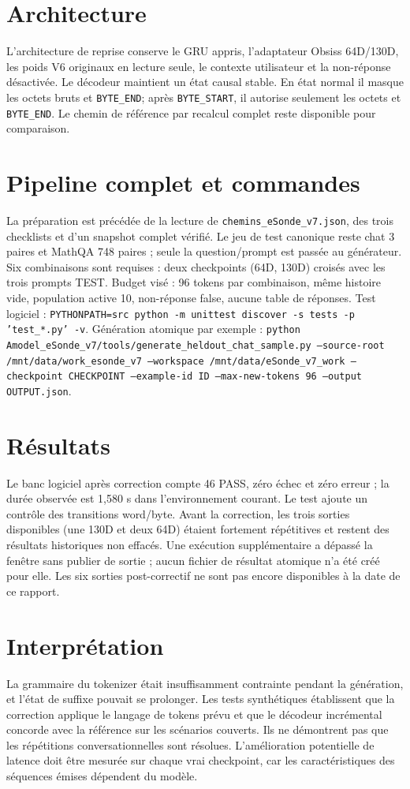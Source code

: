 \documentclass[11pt,a4paper]{report}
\begin{document}
\section{Architecture}
L'architecture de reprise conserve le GRU appris, l'adaptateur Obsiss 64D/130D, les poids V6 originaux en lecture seule, le contexte utilisateur et la non-réponse désactivée. Le décodeur maintient un état causal stable. En état normal il masque les octets bruts et \texttt{BYTE\_END}; après \texttt{BYTE\_START}, il autorise seulement les octets et \texttt{BYTE\_END}. Le chemin de référence par recalcul complet reste disponible pour comparaison.
\section{Pipeline complet et commandes}
\begin{sloppypar}La préparation est précédée de la lecture de \texttt{chemins\_eSonde\_v7.json}, des trois checklists et d'un snapshot complet vérifié. Le jeu de test canonique reste chat 3 paires et MathQA 748 paires ; seule la question/prompt est passée au générateur. Six combinaisons sont requises : deux checkpoints (64D, 130D) croisés avec les trois prompts TEST. Budget visé : 96 tokens par combinaison, même histoire vide, population active 10, non-réponse false, aucune table de réponses. Test logiciel : \texttt{PYTHONPATH=src python -m unittest discover -s tests -p 'test\_*.py' -v}. Génération atomique par exemple : \texttt{python Amodel\_eSonde\_v7/tools/generate\_heldout\_chat\_sample.py --source-root /mnt/data/work\_esonde\_v7 --workspace /mnt/data/eSonde\_v7\_work --checkpoint CHECKPOINT --example-id ID --max-new-tokens 96 --output OUTPUT.json}.\end{sloppypar}
\section{Résultats}
Le banc logiciel après correction compte 46 PASS, zéro échec et zéro erreur ; la durée observée est 1,580 s dans l'environnement courant. Le test ajoute un contrôle des transitions word/byte. Avant la correction, les trois sorties disponibles (une 130D et deux 64D) étaient fortement répétitives et restent des résultats historiques non effacés. Une exécution supplémentaire a dépassé la fenêtre sans publier de sortie ; aucun fichier de résultat atomique n'a été créé pour elle. Les six sorties post-correctif ne sont pas encore disponibles à la date de ce rapport.
\section{Interprétation}
La grammaire du tokenizer était insuffisamment contrainte pendant la génération, et l'état de suffixe pouvait se prolonger. Les tests synthétiques établissent que la correction applique le langage de tokens prévu et que le décodeur incrémental concorde avec la référence sur les scénarios couverts. Ils ne démontrent pas que les répétitions conversationnelles sont résolues. L'amélioration potentielle de latence doit être mesurée sur chaque vrai checkpoint, car les caractéristiques des séquences émises dépendent du modèle.
\end{document}
